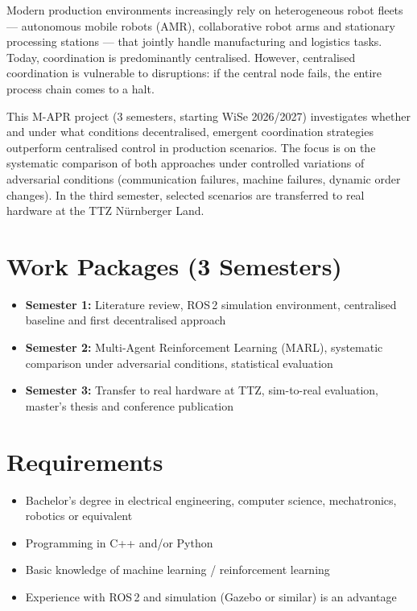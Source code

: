 \documentclass{ohm_project_description}
\begin{document}
\maketitle
\thispagestyle{fancy}

Modern production environments increasingly rely on heterogeneous robot fleets — autonomous mobile robots (AMR), collaborative robot arms and stationary processing stations — that jointly handle manufacturing and logistics tasks. Today, coordination is predominantly centralised. However, centralised coordination is vulnerable to disruptions: if the central node fails, the entire process chain comes to a halt.

This M-APR project (3 semesters, starting WiSe 2026/2027) investigates whether and under what conditions decentralised, emergent coordination strategies outperform centralised control in production scenarios. The focus is on the systematic comparison of both approaches under controlled variations of adversarial conditions (communication failures, machine failures, dynamic order changes). In the third semester, selected scenarios are transferred to real hardware at the TTZ Nürnberger Land.

\section*{Work Packages (3 Semesters)}
\begin{itemize}[leftmargin=0.5cm]
    \setlength\itemsep{.1em}
    \item \textbf{Semester 1:} Literature review, ROS\,2 simulation environment, centralised baseline and first decentralised approach
    \item \textbf{Semester 2:} Multi-Agent Reinforcement Learning (MARL), systematic comparison under adversarial conditions, statistical evaluation
    \item \textbf{Semester 3:} Transfer to real hardware at TTZ, sim-to-real evaluation, master's thesis and conference publication
\end{itemize}

\section*{Requirements}
\begin{itemize}[leftmargin=0.5cm]
    \setlength\itemsep{.1em}
    \item Bachelor's degree in electrical engineering, computer science, mechatronics, robotics or equivalent
    \item Programming in C++ and/or Python
    \item Basic knowledge of machine learning / reinforcement learning
    \item Experience with ROS\,2 and simulation (Gazebo or similar) is an advantage
\end{itemize}
\end{document}
